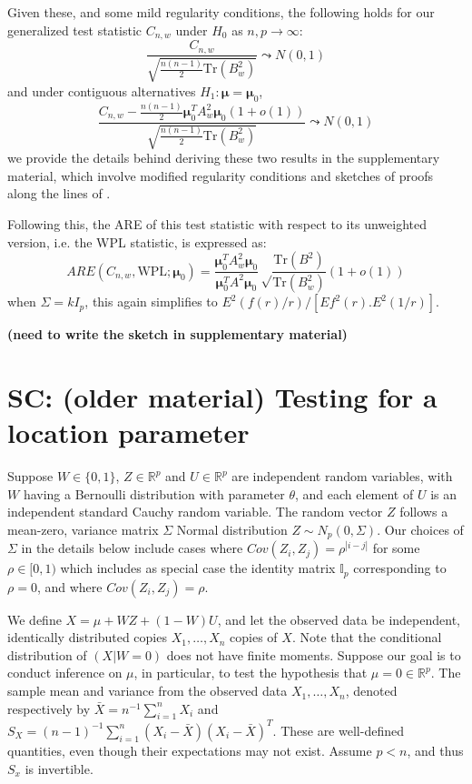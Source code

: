 \documentclass[12pt,letterpaper]{article}
\newcommand{\bfmu}{{\boldsymbol{\mu}}}
\newcommand{\BI}{\mathbb{I}}
\newcommand{\BR}{\mathbb{R}}
\theoremstyle{Example}
\begin{document}
Given these, and some mild regularity conditions, the following holds for our generalized test statistic $C_{n,w}$ under $H_0$ as $n,p \rightarrow \infty$:
%
\begin{equation}\label{eqn:hdtest1}
\frac{C_{n,w}}{\sqrt{\frac{n(n-1)}{2} \text{Tr}(B_w^2)}} \leadsto N(0,1)
\end{equation}
%
and under contiguous alternatives $H_1: \bfmu = \bfmu_0$,
%
\begin{equation}\label{eqn:hdtest2}
\frac{C_{n,w} - \frac{n(n-1)}{2} \bfmu_0^T A_w^2 \bfmu_0 (1 + o(1)) }{\sqrt{\frac{n(n-1)}{2} \text{Tr}(B_w^2)}} \leadsto N(0,1)
\end{equation}
%
we provide the details behind deriving these two results in the supplementary material, which involve modified regularity conditions and sketches of proofs along the lines of \cite{WangPengLi15}.

Following this, the ARE of this test statistic with respect to its unweighted version, i.e. the WPL statistic, is expressed as:
%
$$
ARE(C_{n,w}, \text{WPL}; \bfmu_0) = \frac{\bfmu_0^T A_w^2 \bfmu_0}{\bfmu_0^T A^2 \bfmu_0} \sqrt\frac{\text{Tr}(B^2)}{\text{Tr}(B_w^2)} (1 + o(1))
$$
%
when $\Sigma = kI_p$, this again simplifies to $E^2(f(r)/r)/[E f^2(r). E^2(1/r)]$.

{\color{red}\bf (need to write the sketch in supplementary material) }


	

\section{SC: (older material) Testing for a location parameter}

Suppose $W \in \{ 0, 1 \}$, $Z \in \BR^{p}$ and $U \in \BR^{p}$ 
are independent  random variables, with 
$W$ having a Bernoulli distribution with parameter $\theta$, 
and each 
element of $U$ is an independent standard Cauchy random variable. 
The random vector $Z$ follows a mean-zero, variance matrix $\Sigma$ Normal distribution 
$Z \sim N_{p} (0, \Sigma)$. Our choices of $\Sigma$ in the details 
below include 
cases where $Cov (Z_{i}, Z_{j}) = \rho^{ | i - j|}$ for some $\rho \in [0, 1)$
which includes as special case the identity matrix $\BI_{p}$ corresponding to 
$\rho = 0$, and where $Cov (Z_{i}, Z_{j}) = \rho$. 

We define $X = \mu + W Z + (1 - W) U$, and let the observed data be 
independent, identically distributed copies $X_{1}, \ldots, X_{n}$ copies of $X$. 
Note that the conditional distribution of $(X | W = 0)$ does not have finite moments.
Suppose our goal is to conduct inference on $\mu$, in particular, to test the hypothesis 
that $\mu = 0 \in \BR^{p}$. 
The sample mean and variance from the observed data $X_{1}, \ldots, X_{n}$, 
denoted respectively by $\bar{X} = n^{-1} \sum_{i = 1}^{n} X_{i}$ and
$S_{X} = (n - 1)^{-1} \sum_{i = 1}^{n} ( X_{i} - \bar{X} )( X_{i} - \bar{X} )^{T}$. 
These are 
well-defined quantities, even though their expectations may not exist.
Assume $p < n$, and thus $S_{x}$ is invertible. 
\end{document}
